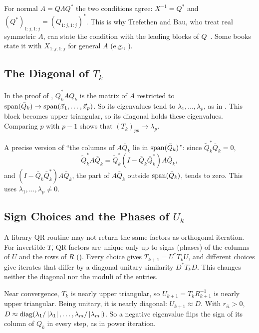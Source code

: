 For normal $A = Q\Lambda Q^\ast$ the two conditions agree: $X^{-1} = Q^\ast$ and $(Q^\ast)_{1:j,1:j} = (Q_{1:j,1:j})^\ast$. This is why Trefethen and Bau, who treat real symmetric $A$, can state the condition with the leading blocks of $Q$~\cite[Thm.~28.4]{TB}. Some books state it with $X_{1:j,1:j}$ for general $A$ (e.g., \cite[Thm.~4.8]{Demmel}).

\subsection{The Diagonal of $T_k$}
\label{sec:conv-schur-diag}

In the proof of , $\bar{Q}_k^\ast A\bar{Q}_k$ is the matrix of $A$ restricted to $\operatorname{span}(\bar{Q}_k) \to \operatorname{span}(\vec{x}_1, \dots, \vec{x}_p)$. So its eigenvalues tend to $\lambda_1, \dots, \lambda_p$, as in . This block becomes upper triangular, so its diagonal holds these eigenvalues. Comparing $p$ with $p - 1$ shows that $(T_k)_{pp} \to \lambda_p$.

A precise version of ``the columns of $A\bar{Q}_k$ lie in $\operatorname{span}(\bar{Q}_k)$'': since $\tilde{Q}_k^\ast\bar{Q}_k = 0$,
\begin{equation}
  \tilde{Q}_k^\ast A\bar{Q}_k = \tilde{Q}_k^\ast(I - \bar{Q}_k\bar{Q}_k^\ast)A\bar{Q}_k,
\end{equation}
and $(I - \bar{Q}_k\bar{Q}_k^\ast)A\bar{Q}_k$, the part of $A\bar{Q}_k$ outside $\operatorname{span}(\bar{Q}_k)$, tends to zero. This uses $\lambda_1, \dots, \lambda_p \ne 0$.

\subsection{Sign Choices and the Phases of $U_k$}
\label{sec:qr-alg-phases}

A library QR routine may not return the same factors as orthogonal iteration. For invertible $T$, QR factors are unique only up to signs (phases) of the columns of $U$ and the rows of $R$ (). Every choice gives $T_{k+1} = U^\ast T_kU$, and different choices give iterates that differ by a diagonal unitary similarity $D^\ast T_kD$. This changes neither the diagonal nor the moduli of the entries.

Near convergence, $T_k$ is nearly upper triangular, so $U_{k+1} = T_kR_{k+1}^{-1}$ is nearly upper triangular. Being unitary, it is nearly diagonal: $U_{k+1} \approx D$. With $r_{ii} > 0$, $D \approx \operatorname{diag}(\lambda_1/\left\lvert \lambda_1 \right\rvert, \dots, \lambda_m/\left\lvert \lambda_m \right\rvert)$. So a negative eigenvalue flips the sign of its column of $Q_k$ in every step, as in power iteration.


